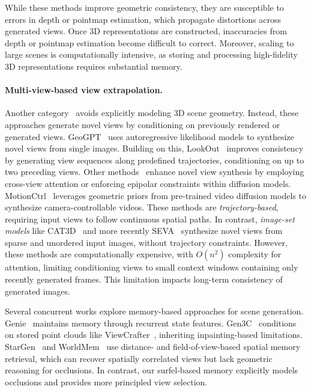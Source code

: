 While these methods improve geometric consistency, they are susceptible to errors in depth or pointmap estimation, which propagate distortions across generated views.
Once 3D representations are constructed, inaccuracies from depth or pointmap estimation become difficult to correct.
Moreover, scaling to large scenes is computationally intensive, as storing and processing high-fidelity 3D representations requires substantial memory.



\paragraph{Multi-view-based view extrapolation.}
Another category~\cite{geogpt, ren2022look, tseng2023consistent, photometricnvs, wang2024motionctrl, gao2024cat3d, seva} avoids explicitly modeling 3D scene geometry.
Instead, these approaches generate novel views by conditioning on previously rendered or generated views.
GeoGPT~\cite{geogpt} uses autoregressive likelihood models to synthesize novel views from single images.
Building on this, LookOut~\cite{ren2022look} improves consistency by generating view sequences along predefined trajectories, conditioning on up to two preceding views.
Other methods~\cite{tseng2023consistent, photometricnvs} enhance novel view synthesis by employing cross-view attention or enforcing epipolar constraints within diffusion models.
MotionCtrl~\cite{wang2024motionctrl} leverages geometric priors from pre-trained video diffusion models to synthesize camera-controllable videos.
These methods are \textit{trajectory-based}, requiring input views to follow continuous spatial paths.
In contrast, \textit{image-set models} like CAT3D~\cite{gao2024cat3d} and more recently SEVA~\cite{seva} synthesize novel views from sparse and unordered input images, without trajectory constraints.
However, these methods are computationally expensive, with $O(n^2)$ complexity for attention, limiting conditioning views to small context windows containing only recently generated frames.
This limitation impacts long-term consistency of generated images.

Several concurrent works explore memory-based approaches for scene generation.
Genie~\cite{bruce2024genie, parker-holder24genie} maintains memory through recurrent state features.
Gen3C~\cite{ren2025gen3c} conditions on stored point clouds like ViewCrafter~\cite{yu2024viewcrafter}, inheriting inpainting-based limitations.
StarGen~\cite{zhai2025stargen} and WorldMem~\cite{xiao2025worldmemlongtermconsistentworld} use distance- and field-of-view-based spatial memory retrieval, which can recover spatially correlated views but lack geometric reasoning for occlusions.
In contrast, our surfel-based memory explicitly models occlusions and provides more principled view selection.
